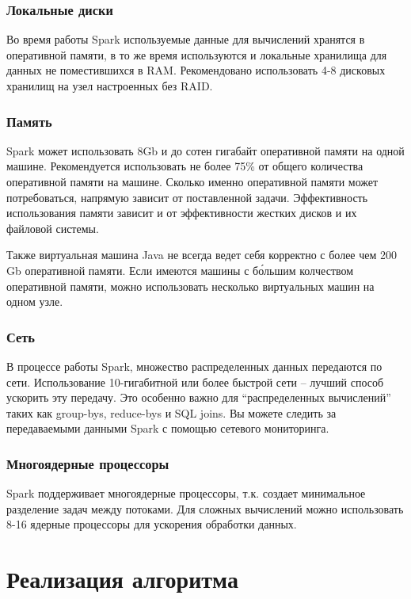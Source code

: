 \documentclass[12pt,a4paper]{report}
\begin{document}
\subsubsection{Локальные диски}

Во время работы Spark используемые данные для вычислений хранятся в оперативной памяти, в то же время используются и локальные хранилища для данных не поместившихся в RAM. Рекомендовано использовать 4-8 дисковых хранилищ на узел настроенных без RAID. 

\subsubsection{Память} 

Spark может использовать  8Gb и до сотен гигабайт оперативной памяти на одной машине. Рекомендуется использовать не более 75\% от общего количества оперативной памяти на машине. Сколько именно оперативной памяти может потребоваться, напрямую зависит от поставленной задачи.  Эффективность использования памяти зависит и от эффективности жестких дисков и их файловой системы.

Также виртуальная машина Java не всегда ведет себя корректно с более чем 200 Gb оперативной памяти. Если имеются  машины с б\'{о}льшим колчеством оперативной памяти, можно использовать несколько виртуальных машин на одном узле.

\subsubsection{Сеть} 

В процессе работы Spark, множество распределенных данных передаются по сети. Использование 10-гигабитной или более быстрой сети -- лучший способ ускорить эту передачу. Это особенно важно для “распределенных вычислений” таких как group-bys, reduce-bys и SQL joins. Вы можете следить за передаваемыми данными Spark с помощью сетевого мониторинга.

\subsubsection{Многоядерные процессоры} 

Spark поддерживает многоядерные процессоры, т.к. создает минимальное разделение задач между потоками. Для сложных вычислений можно использовать 8-16 ядерные процессоры для ускорения обработки данных.

\section{Реализация алгоритма}
\end{document}
